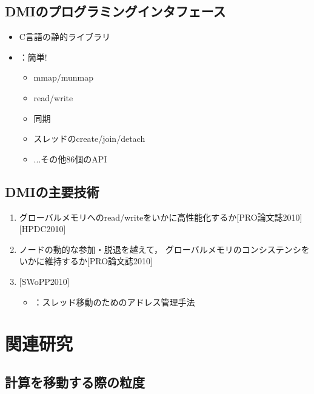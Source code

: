 \documentclass[25pt,papersize,landscape]{jsarticle}
\begin{document}
\subsection{DMIのプログラミングインタフェース}

\begin{itemize}
\item C言語の静的ライブラリ
\item {}：簡単!
  \begin{itemize}
  \item mmap/munmap
  \item read/write
  \item 同期
  \item スレッドのcreate/join/detach
  \item ...その他86個のAPI
  \end{itemize}
\end{itemize}


\subsection{DMIの主要技術}

\begin{enumerate}
\item グローバルメモリへのread/writeをいかに高性能化するか[PRO論文誌2010][HPDC2010]
\item ノードの動的な参加・脱退を越えて，
  グローバルメモリのコンシステンシをいかに維持するか[PRO論文誌2010]
\item {}[SWoPP2010]
  \begin{itemize}
  \item {}：スレッド移動のためのアドレス管理手法
  \end{itemize}
\end{enumerate}


\section{関連研究}

\subsection{計算を移動する際の粒度}
\end{document}
